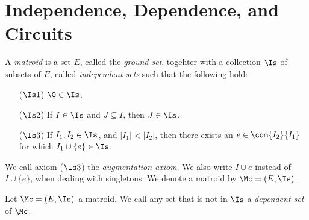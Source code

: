 \section{Independence, Dependence, and Circuits}\label{section_1.1}

\begin{definition}
  A \textit{matroid} is a set $E$, called the \textit{ground set},
  togehter with a collection $\Is$ of subsets of $E$, called
  \textit{independent sets} such that the following hold:
  \begin{enumerate}
    \item[($\Is1$)] $\0 \in \Is$.

    \item[($\Is2$)] If $I \in \Is$ and $J \subseteq I$, then $J \in
      \Is$.

    \item[($\Is3$)] If $I_1,I_2 \in \Is$, and $|I_1|<|I_2|$, then there
      exists an $e \in \com{I_2}{I_1}$ for which $I_1 \cup \{e\} \in \Is$.
  \end{enumerate}
  We call axiom ($\Is3$) the \textit{augmentation axiom}. We also
  write $I \cup e$ instead of $I \cup \{e\}$, when dealing with
  singletons. We denote a matroid by $\Mc=(E,\Is)$.
\end{definition}

\begin{definition}
  Let $\Mc=(E,\Is)$ a matroid. We call any set that is not in $\Is$ a
  \textit{dependent set} of $\Mc$.
\end{definition}

